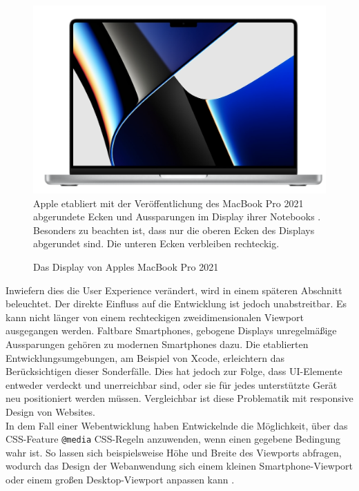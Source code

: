\documentclass[a4paper]{scrartcl}
\begin{document}
\begin{figure}[H]
	\centering
	\caption{Das Display von Apples MacBook Pro 2021}
	\includegraphics[scale=0.25]{_assets/macbook_display.png} \\
	Apple etabliert mit der Veröffentlichung des MacBook Pro 2021 abgerundete Ecken und Aussparungen im Display ihrer Notebooks \autocite{Macbook_Display}. Besonders zu beachten ist, dass nur die oberen Ecken des Displays abgerundet sind. Die unteren Ecken verbleiben rechteckig.
\end{figure}

Inwiefern dies die User Experience verändert, wird in einem späteren Abschnitt beleuchtet. Der direkte Einfluss auf die Entwicklung ist jedoch unabstreitbar. Es kann nicht länger von einem rechteckigen zweidimensionalen Viewport ausgegangen werden. Faltbare Smartphones, gebogene Displays unregelmäßige Aussparungen gehören zu modernen Smartphones dazu. Die etablierten Entwicklungsumgebungen, am Beispiel von Xcode, erleichtern das Berücksichtigen dieser Sonderfälle. Dies hat jedoch zur Folge, dass UI-Elemente entweder verdeckt und unerreichbar sind, oder sie für jedes unterstützte Gerät neu positioniert werden müssen. Vergleichbar ist diese Problematik mit responsive Design von Websites. \\
In dem Fall einer Webentwicklung haben Entwickelnde die Möglichkeit, über das CSS-Feature \texttt{@media} CSS-Regeln anzuwenden, wenn einen gegebene Bedingung wahr ist. So lassen sich beispielsweise Höhe und Breite des Viewports abfragen, wodurch das Design der Webanwendung sich einem kleinen Smartphone-Viewport oder einem großen Desktop-Viewport anpassen kann \autocite{Media_Queries}. \\
\end{document}
